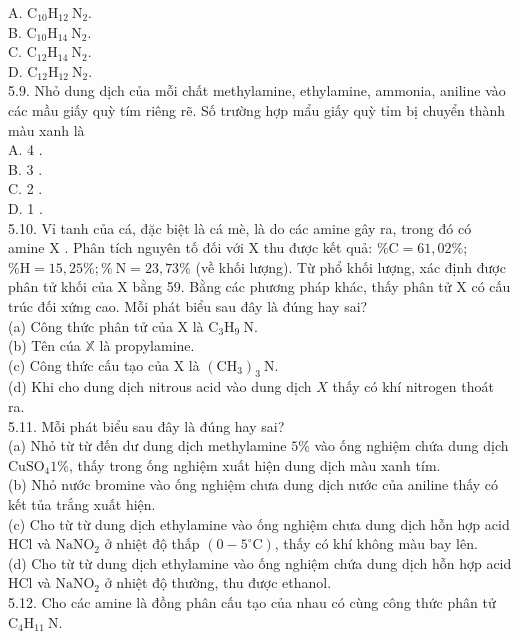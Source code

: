 \documentclass[10pt]{article}
\begin{document}
A. $\mathrm{C}_{10} \mathrm{H}_{12} \mathrm{~N}_{2}$.\\
B. $\mathrm{C}_{10} \mathrm{H}_{14} \mathrm{~N}_{2}$.\\
C. $\mathrm{C}_{12} \mathrm{H}_{14} \mathrm{~N}_{2}$.\\
D. $\mathrm{C}_{12} \mathrm{H}_{12} \mathrm{~N}_{2}$.\\
5.9. Nhỏ dung dịch của mỗi chất methylamine, ethylamine, ammonia, aniline vào các mầu giấy quỳ tím riêng rẽ. Số trường hợp mẩu giấy quỳ tỉm bị chuyển thành màu xanh là\\
A. 4 .\\
B. 3 .\\
C. 2 .\\
D. 1 .\\
5.10. Vỉ tanh của cá, đặc biệt là cá mè, là do các amine gây ra, trong đó có amine X . Phân tích nguyên tố đối với X thu được kết quả: $\% \mathrm{C}=61,02 \%$; $\% \mathrm{H}=15,25 \% ; \% \mathrm{~N}=23,73 \%$ (về khối lượng). Từ phổ khối lượng, xác định được phân tử khối của X bằng 59. Bằng các phương pháp khác, thấy phân tử X có cấu trúc đối xứng cao. Mỗi phát biểu sau đây là đúng hay sai?\\
(a) Công thức phân tử của X là $\mathrm{C}_{3} \mathrm{H}_{9} \mathrm{~N}$.\\
(b) Tên cúa $\mathbb{X}$ là propylamine.\\
(c) Công thức cấu tạo của X là $\left(\mathrm{CH}_{3}\right)_{3} \mathrm{~N}$.\\
(d) Khi cho dung dịch nitrous acid vào dung dịch $X$ thấy có khí nitrogen thoát ra.\\
5.11. Mỗi phát biểu sau đây là đúng hay sai?\\
(a) Nhỏ từ từ đến dư dung dịch methylamine $5 \%$ vào ống nghiệm chứa dung dịch $\mathrm{CuSO}_{4} 1 \%$, thấy trong ống nghiệm xuất hiện dung dịch màu xanh tím.\\
(b) Nhỏ nước bromine vào ống nghiệm chưa dung dịch nước của aniline thấy có kết tủa trắng xuất hiện.\\
(c) Cho từ từ dung dịch ethylamine vào ống nghiệm chưa dung dịch hỗn hợp acid HCl và $\mathrm{NaNO}_{2}$ ở nhiệt độ thấp $\left(0-5^{\circ} \mathrm{C}\right)$, thấy có khí không màu bay lên.\\
(d) Cho từ từ dung dịch ethylamine vào ống nghiệm chứa dung dịch hỗn hợp acid HCl và $\mathrm{NaNO}_{2}$ ở nhiệt độ thường, thu được ethanol.\\
5.12. Cho các amine là đồng phân cấu tạo của nhau có cùng công thức phân tử $\mathrm{C}_{4} \mathrm{H}_{11} \mathrm{~N}$.\\
\end{document}
